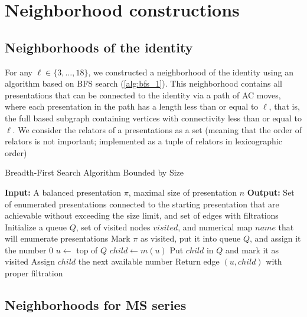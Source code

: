 
\section{Neighborhood constructions}\label{s:neighborhoods}

\subsection{Neighborhoods of the identity}

For any $\ell \in \{3, \dots, 18\}$, we constructed a neighborhood of the identity using an algorithm based on BFS search (\autoref{alg:bfs_1}).
This neighborhood contains all presentations that can be connected to the identity via a path of AC moves, where each presentation in the path has a length less than or equal to $\ell$, that is, the full based subgraph containing vertices with connectivity less than or equal to $\ell$.
We consider the relators of a presentations as a set (meaning that the order of relators is not important; implemented as a tuple of relators in lexicographic order) 

\begin{algorithm}
	\caption{Breadth-First Search Algorithm Bounded by Size}
    \label{alg:bfs_1}
	\begin{algorithmic}[1]
		\State \textbf{Input:} A balanced presentation $\pi$, maximal size of presentation $n$
		\State \textbf{Output:} Set of enumerated presentations connected to the starting presentation that are achievable without exceeding the size limit, and set of edges with filtrations
		\State Initialize a queue $Q$, set of visited nodes $visited$, and numerical map $name$ that will enumerate presentations
		\State Mark $\pi$ as visited, put it into queue $Q$, and assign it the number $0$
		\State $u \gets $ top of $Q$ 
		\State $child \gets m(u)$
		\State Put $child$ in $Q$ and mark it as visited
		\State Assign $child$ the next available number
		\EndIf
		\State Return edge $(u, child)$ with proper filtration
		\EndIf
		\EndFor
		\EndWhile
	\end{algorithmic}
\end{algorithm}

\subsection{Neighborhoods for MS series}

